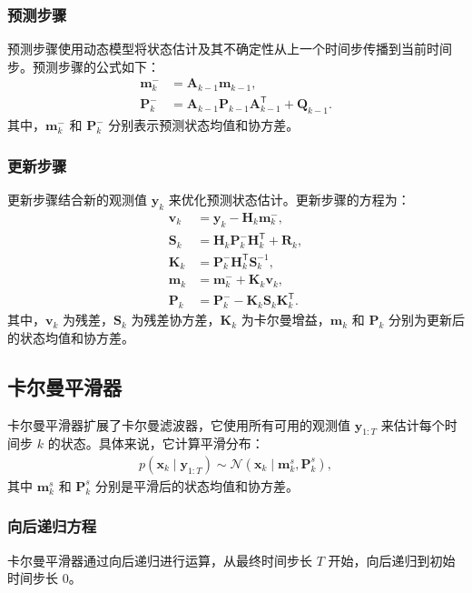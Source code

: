 \subsubsection*{预测步骤}
预测步骤使用动态模型将状态估计及其不确定性从上一个时间步传播到当前时间步。预测步骤的公式如下：
\begin{align}
\mathbf{m}_k^- &= \mathbf{A}_{k-1} \mathbf{m}_{k-1}, \\
\mathbf{P}_k^- &= \mathbf{A}_{k-1} \mathbf{P}_{k-1} \mathbf{A}_{k-1}^\mathsf{T} + \mathbf{Q}_{k-1}.
\end{align}
其中，\(\mathbf{m}_k^-\) 和 \(\mathbf{P}_k^-\) 分别表示预测状态均值和协方差。

\subsubsection*{更新步骤}
更新步骤结合新的观测值 \(\mathbf{y}_k\) 来优化预测状态估计。更新步骤的方程为：
\begin{align}
 \mathbf{v}_k &= \mathbf{y}_k - \mathbf{H}_k \mathbf{m}_k^-, \label{eq: kalman filter vk} \\
 \mathbf{S}_k &= \mathbf{H}_k \mathbf{P}_k^- \mathbf{H}_k^\mathsf{T} + \mathbf{R}_k, \label{eq: kalman filter Sk} \\
 \mathbf{K}_k &= \mathbf{P}_k^- \mathbf{H}_k^\mathsf{T} \mathbf{S}_k^{-1}, \\
\mathbf{m}_k &= \mathbf{m}_k^- + \mathbf{K}_k \mathbf{v}_k, \\
\mathbf{P}_k &= \mathbf{P}_k^- - \mathbf{K}_k \mathbf{S}_k \mathbf{K}_k^\mathsf{T}.
\end{align}
其中，\(\mathbf{v}_k\) 为残差，\(\mathbf{S}_k\) 为残差协方差，\(\mathbf{K}_k\) 为卡尔曼增益，\(\mathbf{m}_k\) 和 \(\mathbf{P}_k\) 分别为更新后的状态均值和协方差。

\subsection{卡尔曼平滑器}
卡尔曼平滑器扩展了卡尔曼滤波器，它使用所有可用的观测值 \(\mathbf{y}_{1:T}\) 来估计每个时间步 \(k\) 的状态。具体来说，它计算平滑分布：
\begin{align}
p(\mathbf{x}_k \mid \mathbf{y}_{1:T}) \sim \mathcal{N}(\mathbf{x}_k \mid \mathbf{m}_k^s, \mathbf{P}_k^s),
\end{align}
其中 \(\mathbf{m}_k^s\) 和 \(\mathbf{P}_k^s\) 分别是平滑后的状态均值和协方差。

\subsubsection*{向后递归方程}
卡尔曼平滑器通过向后递归进行运算，从最终时间步长 \(T\) 开始，向后递归到初始时间步长 \(0\)。

